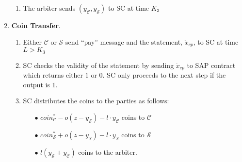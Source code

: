 \begin{enumerate}
\begin{enumerate}
\item The arbiter sends $(y_{\scriptscriptstyle\mathcal C},y_{\scriptscriptstyle\mathcal S})$  to SC at time $K_{\scriptscriptstyle 3}$
\end{enumerate}
\item \textbf{Coin Transfer}\label{RCSP::CoinTransfer}.
\begin{enumerate}
\item Either $\mathcal C$ or $\mathcal S$ send ``pay'' message and the statement, $\ddot{x}_{\scriptscriptstyle cp}$,  to SC at time $L>K_{\scriptscriptstyle 3}$
\item SC checks the validity of the statement by sending $\ddot{x}_{\scriptscriptstyle cp}$ to SAP contract which  returns  either $1$ or $0$. SC only proceeds to the next step if the output is $1$. 
\item SC distributes the coins to the parties as follows:

\begin{itemize}
\item[$\bullet$]   $coin^{\scriptscriptstyle *}_{\scriptscriptstyle\mathcal C}-o(z-y_{\scriptscriptstyle\mathcal S})-l\cdot y_{\scriptscriptstyle\mathcal C}$ coins  to $\mathcal C$
\item[$\bullet$] $coin^{\scriptscriptstyle *}_{\scriptscriptstyle\mathcal S}+o(z-y_{\scriptscriptstyle\mathcal S})-l\cdot y_{\scriptscriptstyle\mathcal S}$ coins to $\mathcal S$
\item[$\bullet$] $l(y_{\scriptscriptstyle\mathcal S}+y_{\scriptscriptstyle\mathcal C})$ coins to the arbiter.  
\end{itemize}

\end{enumerate}
\end{enumerate}



